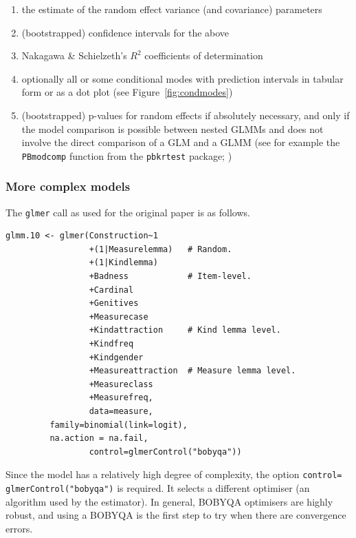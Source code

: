 \begin{enumerate}
  \item the estimate of the random effect variance (and covariance) parameters
  \item (bootstrapped) confidence intervals for the above
  \item Nakagawa \& Schielzeth's $R^2$ coefficients of determination
  \item optionally all or some conditional modes with prediction intervals in tabular form or as a dot plot (see Figure~\ref{fig:condmodes})
  \item (bootstrapped) p-values for random effects if absolutely necessary, and only if the model comparison is possible between nested GLMMs and does not involve the direct comparison of a GLM and a GLMM (see for example the \texttt{PBmodcomp} function from the \texttt{pbkrtest} package; \citealt{HalekohHojsgaard2014}) 
\end{enumerate}

\subsubsection{More complex models}

The \texttt{glmer} call as used for the original paper is as follows.

\vspace{0.5\baselineskip}

\begin{lstlisting}
glmm.10 <- glmer(Construction~1
                 +(1|Measurelemma)   # Random.
                 +(1|Kindlemma)
                 +Badness            # Item-level.
                 +Cardinal
                 +Genitives
                 +Measurecase
                 +Kindattraction     # Kind lemma level.
                 +Kindfreq
                 +Kindgender
                 +Measureattraction  # Measure lemma level.
                 +Measureclass
                 +Measurefreq,
                 data=measure,
		 family=binomial(link=logit),
		 na.action = na.fail,
                 control=glmerControl("bobyqa"))
\end{lstlisting}

Since the model has a relatively high degree of complexity, the option \texttt{control=} \texttt{glmerControl("bobyqa")} is required.
It selects a different optimiser (an algorithm used by the estimator).
In general, BOBYQA optimisers are highly robust, and using a BOBYQA is the first step to try when there are convergence errors.

